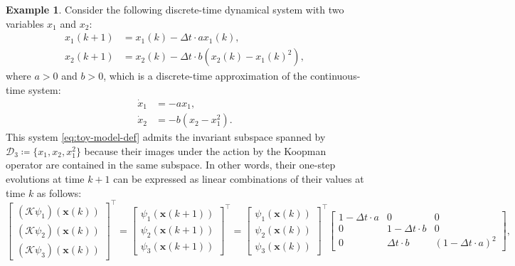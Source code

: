 \documentclass{article}
\theoremstyle{plain}
\theoremstyle{definition}
\newtheorem{example}[theorem]{Example}
\def\tp{\intercal}
\def\x{\mathbf{x}}
\def\Koop{\mathcal{K}}
\def\Dc{\mathcal{D}}
\begin{document}
	\begin{example}\label{ex:toy2d}
		Consider the following discrete-time dynamical system with two variables $x_1$ and $x_2$:
		\begin{equation}\label{eq:toy-model-def}
			\begin{aligned}
				x_1(k+1) & = x_1(k)- \Delta t \cdot a x_1(k), \\ 
				x_2(k+1) & = x_2(k)- \Delta t \cdot b(x_2(k) - x_1(k)^2), 
			\end{aligned}
		\end{equation}
		where $a >0$ and $b >0$, which is a discrete-time approximation of the continuous-time system:
		\begin{equation*}
			\begin{aligned}
				\dot{x}_1 &= -a x_1, \\ 
				\dot{x}_2 &= -b (x_2 - x_1^2).
			\end{aligned}
		\end{equation*}
		This system \eqref{eq:toy-model-def} admits the invariant subspace spanned by $\Dc_3 \coloneqq \{x_1, x_2, x_1^2\}$ because their images under the action by the Koopman operator are contained in the same subspace. In other words, their one-step evolutions at time $k+1$ can be expressed as linear combinations of their values at time $k$ as follows:
		\begin{equation}\label{eq:toy-model-linear}
			\begin{bmatrix}
				(\Koop \psi_1)(\x(k)) \\
				(\Koop \psi_2)(\x(k)) \\
				(\Koop \psi_3)(\x(k))
			\end{bmatrix}^\tp =
			\begin{bmatrix}
				\psi_1(\x(k+1)) \\
				\psi_2(\x(k+1)) \\
				\psi_3(\x(k+1))
			\end{bmatrix}^\tp =
			\begin{bmatrix}
				\psi_1(\x(k)) \\
				\psi_2(\x(k)) \\
				\psi_3(\x(k))
			\end{bmatrix}^\tp
			\begin{bmatrix}
				1 - \Delta t \cdot a  & 0 & 0 \\
				0   & 1 - \Delta t \cdot b &  0 \\
				0  & \Delta t \cdot b  & (1 - \Delta t \cdot a)^2
			\end{bmatrix},
		\end{equation}

\end{example}
\end{document}
